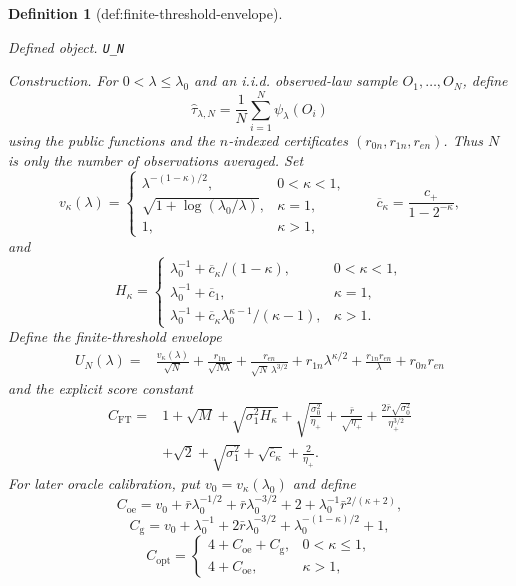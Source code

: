 \documentclass{article}
\newtheorem{definition}{Definition}
\begin{document}
\begin{definition}[def:finite-threshold-envelope]\label{def:finite-threshold-envelope}
\par\smallskip\noindent\emph{Defined object.} \texttt{U\_\allowbreak{}N}
\par\smallskip\noindent\emph{Construction.} For \(0<\lambda\leq\lambda_0\) and an i.i.d. observed-law sample
\(O_1,\ldots,O_N\), define
\[
\widehat\tau_{\lambda,N}=\frac1N\sum_{i=1}^N\psi_\lambda(O_i)
\]
using the public functions and the \(n\)-indexed certificates
\((r_{0n},r_{1n},r_{en})\).  Thus \(N\) is only the number of observations
averaged.  Set
\[
v_\kappa(\lambda)=
\begin{cases}
\lambda^{-(1-\kappa)/2},&0<\kappa<1,\\
\sqrt{1+\log(\lambda_0/\lambda)},&\kappa=1,\\
1,&\kappa>1,
\end{cases}
\qquad
\overline c_\kappa=\frac{c_+}{1-2^{-\kappa}},
\]
and
\[
H_\kappa=
\begin{cases}
\lambda_0^{-1}+\overline c_\kappa/(1-\kappa),&0<\kappa<1,\\
\lambda_0^{-1}+\overline c_1,&\kappa=1,\\
\lambda_0^{-1}+\overline c_\kappa\lambda_0^{\kappa-1}/(\kappa-1),&\kappa>1.
\end{cases}
\]
Define the finite-threshold envelope
\[
\begin{split}
U_N(\lambda)={}&
\frac{v_\kappa(\lambda)}{\sqrt N}
+\frac{r_{1n}}{\sqrt{N\lambda}}
+\frac{r_{en}}{\sqrt N\,\lambda^{3/2}}
+r_{1n}\lambda^{\kappa/2}
+\frac{r_{1n}r_{en}}{\lambda}
+r_{0n}r_{en}
\end{split}
\]
and the explicit score constant
\[
\begin{split}
C_{\mathrm{FT}}={}&1+\sqrt M+\sqrt{\sigma_1^2H_\kappa}
+\sqrt{\frac{\sigma_0^2}{\eta_+}}
+\frac{\bar r}{\sqrt{\eta_+}}
+\frac{2\bar r\sqrt{\sigma_0^2}}{\eta_+^{3/2}}\\
&+\sqrt2+\sqrt{\sigma_1^2}+\sqrt{\overline c_\kappa}
+\frac2{\eta_+}.
\end{split}
\]
For later oracle calibration, put \(v_0=v_\kappa(\lambda_0)\) and define
\[
C_{\mathrm{oe}}
=v_0+\bar r\lambda_0^{-1/2}+\bar r\lambda_0^{-3/2}
+2+\lambda_0^{-1}\bar r^{2/(\kappa+2)},
\]
\[
C_{\mathrm g}
=v_0+\lambda_0^{-1}+2\bar r\lambda_0^{-3/2}
+\lambda_0^{-(1-\kappa)/2}+1,
\]
\[
C_{\mathrm{opt}}=
\begin{cases}
4+C_{\mathrm{oe}}+C_{\mathrm g},&0<\kappa\leq1,\\
4+C_{\mathrm{oe}},&\kappa>1,

\end{cases}\]
\end{definition}
\end{document}
